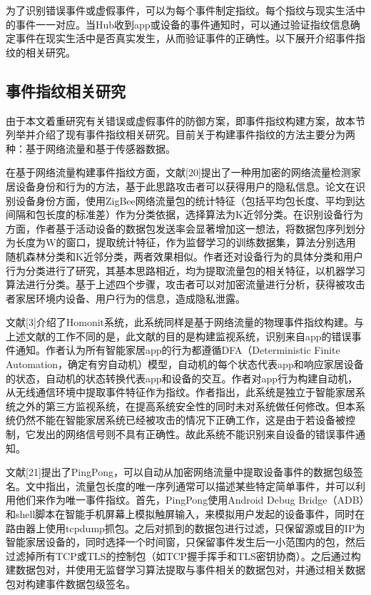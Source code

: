 为了识别错误事件或虚假事件，可以为每个事件制定指纹。每个指纹与现实生活中的事件一一对应。当Hub收到app或设备的事件通知时，可以通过验证指纹信息确定事件在现实生活中是否真实发生，从而验证事件的正确性。以下展开介绍事件指纹的相关研究。

\subsection{事件指纹相关研究}

由于本文着重研究有关错误或虚假事件的防御方案，即事件指纹构建方案，故本节列举并介绍了现有事件指纹相关研究。目前关于构建事件指纹的方法主要分为两种：基于网络流量和基于传感器数据。

在基于网络流量构建事件指纹方面，文献[20]提出了一种用加密的网络流量检测家居设备身份和行为的方法，基于此思路攻击者可以获得用户的隐私信息。论文在识别设备身份方面，使用ZigBee网络流量包的统计特征（包括平均包长度、平均到达间隔和包长度的标准差）作为分类依据，选择算法为K近邻分类。在识别设备行为方面，作者基于活动设备的数据包发送率会显著增加这一想法，将数据包序列划分为长度为W的窗口，提取统计特征，作为监督学习的训练数据集，算法分别选用随机森林分类和K近邻分类，两者效果相似。作者还对设备行为的具体分类和用户行为分类进行了研究，其基本思路相近，均为提取流量包的相关特征，以机器学习算法进行分类。基于上述四个步骤，攻击者可以对加密流量进行分析，获得被攻击者家居环境内设备、用户行为的信息，造成隐私泄露。

文献[3]介绍了Homonit系统，此系统同样是基于网络流量的物理事件指纹构建。与上述文献的工作不同的是，此文献的目的是构建监视系统，识别来自app的错误事件通知。作者认为所有智能家居app的行为都遵循DFA（Deterministic Finite Automation，确定有穷自动机）模型，自动机的每个状态代表app和响应家居设备的状态，自动机的状态转换代表app和设备的交互。作者对app行为构建自动机，从无线通信环境中提取事件特征作为指纹。作者指出，此系统是独立于智能家居系统之外的第三方监视系统，在提高系统安全性的同时未对系统做任何修改。但本系统仍然不能在智能家居系统已经被攻击的情况下正确工作，这是由于若设备被控制，它发出的网络信号则不具有正确性。故此系统不能识别来自设备的错误事件通知。

文献[21]提出了PingPong，可以自动从加密网络流量中提取设备事件的数据包级签名。文中指出，流量包长度的唯一序列通常可以描述某些特定简单事件，并可以利用他们来作为唯一事件指纹。首先，PingPong使用Android Debug Bridge（ADB）和shell脚本在智能手机屏幕上模拟触屏输入，来模拟用户发起的设备事件，同时在路由器上使用tcpdump抓包。之后对抓到的数据包进行过滤，只保留源或目的IP为智能家居设备的，同时选择一个时间窗，只保留事件发生后一小范围内的包，然后过滤掉所有TCP或TLS的控制包（如TCP握手挥手和TLS密钥协商）。之后通过构建数据包对，并使用无监督学习算法提取与事件相关的数据包对，并通过相关数据包对构建事件数据包级签名。

